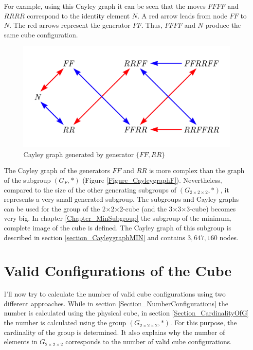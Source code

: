 \documentclass[12pt,a4paper]{article}
\theoremstyle{custom}
\newcommand{\Gtwo}{\ensuremath{G_{2\times 2\times 2}}}
\newcommand{\Ttwo}{2$\times$2$\times$2-}
\newcommand{\Tthree}{3$\times$3$\times$3-}
\begin{document}
For example, using this Cayley graph it can be seen that the moves $FFFF$ and $RRRR$ correspond to the identity element $N$. A red arrow leads from node $FF$ to $N$. The red arrows represent the generator $FF$. Thus, $FFFF$ and $N$ produce the same cube configuration.

\begin{figure}[H]
\centering
\includegraphics[scale=0.65]{Cayleygraph2.png}
\caption{Cayley graph generated by generator $\{ FF, RR \}$}
\label{Figure_CayleygraphFFRR}
\end{figure}

The Cayley graph of the generators $FF$ and $RR$ is more complex than the graph of the subgroup $\left(G_F, \scriptstyle*\right)$ (Figure \ref{Figure_CayleygraphF}). Nevertheless, compared to the size of the other generating subgroups of $\left(\Gtwo, \scriptstyle*\right)$, it represents a very small generated subgroup. The subgroups and Cayley graphs can be used for the group of the \Ttwo cube (and the \Tthree cube) becomes very big. In chapter \ref{Chapter_MinSubgroup} the subgroup of the minimum, complete image of the cube is defined. The Cayley graph of this subgroup is described in section \ref{section_CayleygraphMIN} and contains $3, 647,160$ nodes.

\section{Valid Configurations of the Cube}

\label{Chapter_ValidConfigurations}

I'll now try to calculate the number of valid cube configurations using two different approaches. While in section \ref{Section_NumberConfigurations} the number is calculated using the physical cube, in section \ref{Section_CardinalityOfG} the number is calculated using the group $\left(\Gtwo,\scriptstyle*\right)$. For this purpose, the cardinality of the group is determined. It also explains why the number of elements in $\Gtwo$ corresponds to the number of valid cube configurations.
\end{document}
